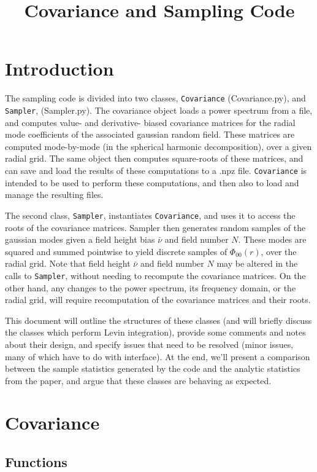 \documentclass[10pt,a4paper]{article}
\title{Covariance and Sampling Code}
\begin{document}
\maketitle
\section{Introduction}

The sampling code is divided into two classes, \verb|Covariance| (Covariance.py), and \verb|Sampler|, (Sampler.py). The covariance object loads a power spectrum from a file, and computes value- and derivative- biased covariance matrices for the radial mode coefficients of the associated gaussian random field. These matrices are computed mode-by-mode (in the spherical harmonic decomposition), over a given radial grid. The same object then computes square-roots of these matrices, and can save and load the results of these computations to a .npz file. \verb|Covariance| is intended to be used to perform these computations, and then also to load and manage the resulting files. 

The second class, \verb|Sampler|, instantiates \verb|Covariance|, and uses it to access the roots of the covariance matrices. Sampler then generates random samples of the gaussian modes given a field height bias $\bar{\nu}$ and field number $N$. These modes are squared and summed pointwise to yield discrete samples of $\Phi_{00}(r)$, over the radial grid. Note that field height $\bar{\nu}$ and field number $N$ may be altered in the calls to \verb|Sampler|, without needing to recompute the covariance matrices. On the other hand, any changes to the power spectrum, its frequency domain, or the radial grid, will require recomputation of the covariance matrices and their roots.

This document will outline the structures of these classes (and will briefly discuss the classes which perform Levin integration), provide some comments and notes about their design, and specify issues that need to be resolved (minor issues, many of which have to do with interface). At the end, we'll present a comparison between the sample statistics generated by the code and the analytic statistics from the paper, and argue that these classes are behaving as expected.

\section{Covariance}
\subsection{Functions}
\end{document}

